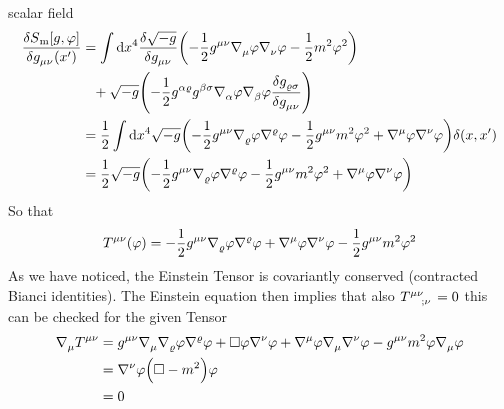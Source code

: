 scalar field
\begin{equation}
\begin{split}
\frac{\delta
S\textsubscript{m}[g,\varphi]}{\delta \tensor{g}{_\mu_\nu}\left(x'\right)}
&=\int \dif x^4 \frac{\delta\sqrt{-g}}{\delta
\tensor{g}{_\mu_\nu}}\left(-\frac{1}{2}\tensor{g}{^\mu^\nu}
\tensor{\nabla}{_\mu}\varphi\tensor{\nabla}{_\nu}\varphi-\frac{1}{2}m^2\varphi^2\right)\\
&\phantom{=}+
\sqrt{-g}\left(-\frac{1}{2}\tensor{g}{^\alpha^\varrho}\tensor{g}{^\beta^\sigma} \tensor{\nabla}{_\alpha}\varphi\tensor{\nabla}{_\beta}\varphi\frac{\delta
\tensor{g}{_\varrho_\sigma}}{\delta \tensor{g}{_\mu_\nu}}\right)\\
&=\frac{1}{2}\int \dif x^4
\sqrt{-g}\left(-\frac{1}{2}\tensor{g}{^\mu^\nu}\tensor{\nabla}{_\varrho}\varphi\tensor{\nabla}{^\varrho}\varphi-\frac{1}{2}\tensor{g}{^\mu^\nu}m^2\varphi^2
+\tensor{\nabla}{^\mu}\varphi\tensor{\nabla}{^\nu}\varphi\right)\delta(x,x')\\
&=\frac{1}{2}\sqrt{-g}\left(-\frac{1}{2}\tensor{g}{^\mu^\nu}\tensor{\nabla}{_\varrho}\varphi\tensor{\nabla}{^\varrho}\varphi-\frac{1}{2}\tensor{g}{^\mu^\nu}m^2\varphi^2
+\tensor{\nabla}{^\mu}\varphi\tensor{\nabla}{^\nu}\varphi\right)
\end{split}
\end{equation}
So that
\begin{equation}
\tensor{T}{^\mu^\nu}(\varphi)
=-\frac{1}{2}\tensor{g}{^\mu^\nu}\tensor{\nabla}{_\varrho}\varphi\tensor{\nabla}{^\varrho}\varphi
+\tensor{\nabla}{^\mu}\varphi\tensor{\nabla}{^\nu}\varphi
-\frac{1}{2}\tensor{g}{^\mu^\nu}m^2\varphi^2
\end{equation}
As we have noticed, the Einstein Tensor is covariantly conserved (contracted
Bianci identities). The Einstein equation then implies that also
$\tensor{T}{^\mu^\nu_{;\nu}}=0$ this can be checked for the given Tensor
\begin{equation}
\begin{split}
\tensor{\nabla}{_\mu}\tensor{T}{^\mu^\nu}
&=\tensor{g}{^\mu^\nu}\tensor{\nabla}{_\mu}\tensor{\nabla}{_\varrho}\varphi\tensor{\nabla}{^\varrho}\varphi+\square\varphi\tensor{\nabla}{^\nu}\varphi+\tensor{\nabla}{^\mu}\varphi\tensor{\nabla}{_\mu}\tensor{\nabla}{^\nu}\varphi
-\tensor{g}{^\mu^\nu}m^2\varphi\tensor{\nabla}{_\mu}\varphi\\
&=\tensor{\nabla}{^\nu}\varphi\left(\square-m^2\right)\varphi\\
&=0
\end{split}
\end{equation}
